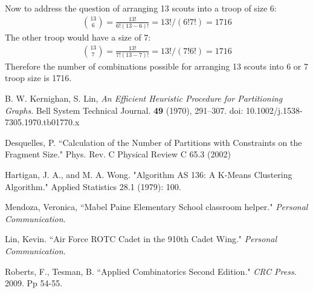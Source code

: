 \documentclass{amsart}
\theoremstyle{definition}
\theoremstyle{remark}
\numberwithin{equation}{section}
\begin{document}
Now to address the question of arranging 13 scouts into a troop of size 6:
\begin{gather*}
	\binom{13}{6} = \frac{13!}{6!(13-6)!} = 13!/(6!7!) = 1716
\end{gather*}
The other troop would have a size of 7:
\begin{gather*}
	\binom{13}{7} = \frac{13!}{7!(13-7)!} = 13!/(7!6!) = 1716
\end{gather*}
Therefore the number of combinations possible for arranging 13 scouts into 6 or 7 troop size is 1716.

\begin{thebibliography}{10}

 B. W. Kernighan, S. Lin, \textit{An Efficient Heuristic Procedure for Partitioning Graphs}. Bell System Technical Journal. \textbf{49} (1970), 291--307. doi: 10.1002/j.1538-7305.1970.tb01770.x

 Desquelles, P. ``Calculation of the Number of Partitions with Constraints on the Fragment Size." Phys. Rev. C Physical Review C 65.3 (2002)

 Hartigan, J. A., and M. A. Wong. "Algorithm AS 136: A K-Means Clustering Algorithm." Applied Statistics 28.1 (1979): 100.

 Mendoza, Veronica, ``Mabel Paine Elementary School classroom helper." \textit{Personal Communication}.

 Lin, Kevin. ``Air Force ROTC Cadet in the 910th Cadet Wing." \textit{Personal Communication}.

 Roberts, F., Tesman, B. ``Applied Combinatorics Second Edition." \textit{CRC Press}. 2009. Pp 54-55.

\end{thebibliography}
\end{document}
